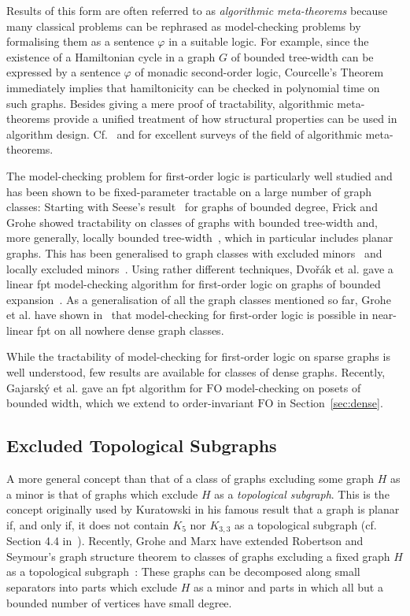 \documentclass[12pt]{amsart}
\newcommand{\FO}{\textrm{FO}}
\begin{document}
Results of this form are often referred to as \emph{algorithmic
  meta-theorems} because many classical problems can be rephrased as
model-checking problems by formalising them as a sentence $\varphi$ in
a suitable logic. For example, since the existence of a Hamiltonian
cycle in a graph $G$ of bounded tree-width can be expressed by a
sentence $\varphi$ of monadic second-order logic, Courcelle's Theorem
immediately implies that hamiltonicity can be checked in polynomial
time on such graphs. Besides giving a mere proof of tractability,
algorithmic meta-theorems provide a unified treatment of how
structural properties can be used in algorithm
design. Cf.~\cite{Grohe07} and \cite{Kreutzer11} for excellent surveys
of the field of algorithmic meta-theorems.

The model-checking problem for first-order logic is particularly well
studied and has been shown to be fixed-parameter tractable on a large
number of graph classes: Starting with Seese's result~\cite{Seese96}
for graphs of bounded degree, Frick and Grohe showed tractability on
classes of graphs with bounded tree-width and, more generally, locally
bounded tree-width~\cite{FrickGro01}, which in particular includes
planar graphs. This has been generalised to graph classes with
excluded minors~\cite{FlumG01} and locally excluded
minors~\cite{DawarGroKre07}. Using rather different techniques, {Dvo\v
  r\'ak} et al. gave a linear fpt model-checking algorithm for
first-order logic on graphs of bounded
expansion~\cite{DvorakKT13}. As a generalisation of all the
graph classes mentioned so far, Grohe et al. have shown
in~\cite{gks14} that model-checking for first-order logic is possible
in near-linear fpt on all nowhere dense graph classes.

While the tractability of model-checking for first-order logic on
sparse graphs is well understood, few results are available for
classes of dense graphs. Recently, Gajarský et al. gave an fpt
algorithm for $\FO{}$ model-checking on posets of bounded width, which
we extend to order-invariant $\FO$ in Section~\ref{sec:dense}.

\subsection*{Excluded Topological Subgraphs}

A more general concept than that of a class of graphs excluding some
graph $H$ as a minor is that of graphs which exclude $H$ as a
\emph{topological subgraph}. This is the concept originally used by
Kuratowski in his famous result that a graph is planar if, and only
if, it does not contain $K_5$ nor $K_{3,3}$ as a topological subgraph
(cf. Section 4.4 in~\cite{diestel}). Recently, Grohe and Marx have
extended Robertson and Seymour's graph structure theorem to classes of
graphs excluding a fixed graph $H$ as a topological
subgraph~\cite{gromar12+}: These graphs can be decomposed along small
separators into parts which exclude $H$ as a minor and parts in which
all but a bounded number of vertices have small degree.
\end{document}
